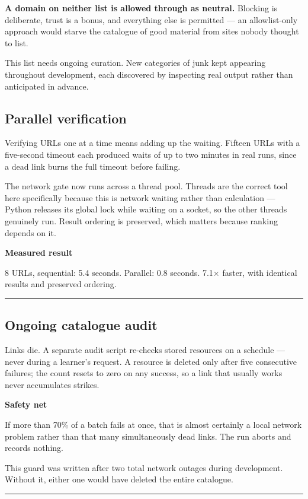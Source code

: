 \documentclass[11pt,a4paper]{article}
\newenvironment{callout}[1]
  {\par\vspace{8pt}\noindent
   \begin{lrbox}{\calloutbox}
   \begin{minipage}{\dimexpr\textwidth-2\fboxsep-8pt\relax}
   \vspace{4pt}
   {\bfseries\color{navy}#1}\par\vspace{4pt}}
  {\vspace{4pt}\end{minipage}%
   \end{lrbox}%
   \noindent\textcolor{navy}{\rule[-\dp\calloutbox]{3pt}{\dimexpr\ht\calloutbox+\dp\calloutbox\relax}}%
   \colorbox{headshade}{\usebox{\calloutbox}}%
   \par\vspace{10pt}}
\begin{document}
\textbf{A domain on neither list is allowed through as neutral.} Blocking is
deliberate, trust is a bonus, and everything else is permitted --- an
allowlist-only approach would starve the catalogue of good material from sites
nobody thought to list.

This list needs ongoing curation. New categories of junk kept appearing
throughout development, each discovered by inspecting real output rather than
anticipated in advance.

\subsection{Parallel verification}

Verifying URLs one at a time means adding up the waiting. Fifteen URLs with a
five-second timeout each produced waits of up to two minutes in real runs,
since a dead link burns the full timeout before failing.

The network gate now runs across a thread pool. Threads are the correct tool
here specifically because this is network waiting rather than calculation ---
Python releases its global lock while waiting on a socket, so the other
threads genuinely run. Result ordering is preserved, which matters because
ranking depends on it.

\begin{callout}{Measured result}
8 URLs, sequential: 5.4 seconds. Parallel: 0.8 seconds. 7.1$\times$ faster,
with identical results and preserved ordering.
\end{callout}

\subsection{Ongoing catalogue audit}

Links die. A separate audit script re-checks stored resources on a schedule
--- never during a learner's request. A resource is deleted only after five
consecutive failures; the count resets to zero on any success, so a link that
usually works never accumulates strikes.

\begin{callout}{Safety net}
If more than 70\% of a batch fails at once, that is almost certainly a local
network problem rather than that many simultaneously dead links. The run
aborts and records nothing.
\par\vspace{4pt}
This guard was written after two total network outages during development.
Without it, either one would have deleted the entire catalogue.
\end{callout}
\end{document}
